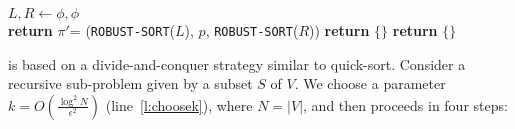 \documentclass[11pt]{llncs}
\newcommand{\RS}{{\texttt{ROBUST-SORT}}}
\begin{document}
\begin{algorithm}[htbp]
{{        $L, R \gets \phi, \phi$ \label{l:endpart1} \\
        {\bf return} $\pi'$= (\RS($L$), $p$, \RS($R$))  \label{l:recursive_calls}
        }
        {\bf return} $\{\}$ \label{l:no_balanced_pivot} 
    }
    {\bf return} $\{\}$ 
    \end{algorithm}
    
  is based on a divide-and-conquer strategy similar to quick-sort. Consider a recursive sub-problem given by a subset $S$ of $V$. We choose a parameter $k = O\left(\frac{\log^2 N}{\epsilon^2}\right)$ (line~\ref{l:choosek}), where $N = |V|$, and then proceeds in four steps:
\end{document}
